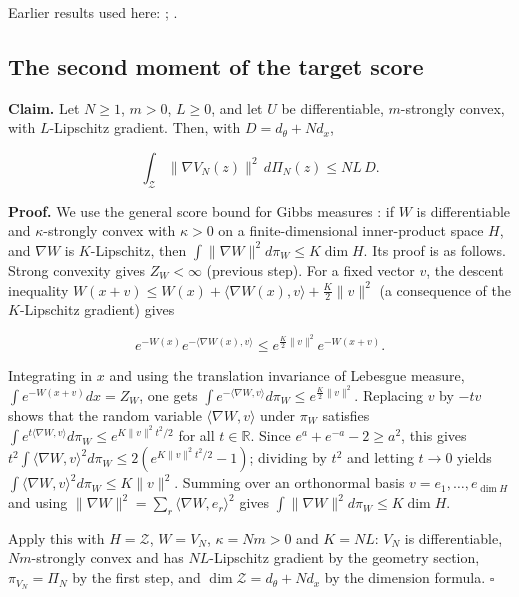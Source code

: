 \documentclass[11pt,a4paper]{report}
\begin{document}
Earlier results used here: \cite[Section~3.17.3]{LangevinLean2026ULASC}; \cite[Section~3.21.4]{LangevinLean2026ULASC}.
\subsection{\texorpdfstring{The second moment of the target score}{The second moment of the target score}}
\label{report-step-IPLA-Foundations-lean-3}


\textbf{Claim.} Let \(N\ge1\), \(m>0\), \(L\ge0\), and let \(U\) be differentiable, \(m\)-strongly convex, with \(L\)-Lipschitz gradient. Then, with \(D=d_\theta+Nd_x\),


\[\int_{\mathcal Z}\|\nabla V_N(z)\|^2\,d\Pi_N(z)\le NL\,D .\]


\textbf{Proof.} We use the general score bound for Gibbs measures \cite[Section~3.27.8]{LangevinLean2026ULASC}: if \(W\) is differentiable and \(\kappa\)-strongly convex with \(\kappa>0\) on a finite-dimensional inner-product space \(H\), and \(\nabla W\) is \(K\)-Lipschitz, then \(\int\|\nabla W\|^2d\pi_W\le K\dim H\). Its proof is as follows. Strong convexity gives \(Z_W<\infty\) (previous step). For a fixed vector \(v\), the descent inequality \(W(x+v)\le W(x)+\langle\nabla W(x),v\rangle+\frac K2\|v\|^2\) (a consequence of the \(K\)-Lipschitz gradient) gives


\[e^{-W(x)}e^{-\langle\nabla W(x),v\rangle}\le e^{\frac K2\|v\|^2}e^{-W(x+v)} .\]


Integrating in \(x\) and using the translation invariance of Lebesgue measure, \(\int e^{-W(x+v)}dx=Z_W\), one gets \(\int e^{-\langle\nabla W,v\rangle}d\pi_W\le e^{\frac K2\|v\|^2}\). Replacing \(v\) by \(-tv\) shows that the random variable \(\langle\nabla W,v\rangle\) under \(\pi_W\) satisfies \(\int e^{t\langle\nabla W,v\rangle}d\pi_W\le e^{K\|v\|^2t^2/2}\) for all \(t\in\mathbb R\). Since \(e^a+e^{-a}-2\ge a^2\), this gives \(t^2\int\langle\nabla W,v\rangle^2d\pi_W\le2(e^{K\|v\|^2t^2/2}-1)\); dividing by \(t^2\) and letting \(t\to0\) yields \(\int\langle\nabla W,v\rangle^2d\pi_W\le K\|v\|^2\). Summing over an orthonormal basis \(v=e_1,\dots,e_{\dim H}\) and using \(\|\nabla W\|^2=\sum_r\langle\nabla W,e_r\rangle^2\) gives \(\int\|\nabla W\|^2d\pi_W\le K\dim H\).




Apply this with \(H=\mathcal Z\), \(W=V_N\), \(\kappa=Nm>0\) and \(K=NL\): \(V_N\) is differentiable, \(Nm\)-strongly convex and has \(NL\)-Lipschitz gradient by the geometry section, \(\pi_{V_N}=\Pi_N\) by the first step, and \(\dim\mathcal Z=d_\theta+Nd_x\) by the dimension formula. \(\square\)
\end{document}
